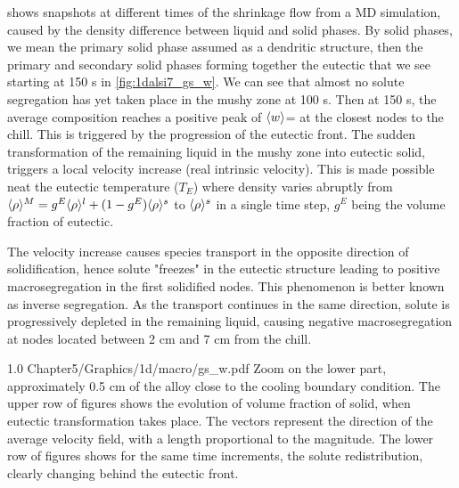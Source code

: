  shows snapshots at different times of the shrinkage flow from a MD simulation, caused by the density difference between liquid and solid phases.
By solid phases, we mean the primary solid phase assumed as a dendritic structure, then the primary and secondary solid phases forming together the eutectic
that we see starting at 150 s in \cref{fig:1dalsi7_gs_w}. 
We can see that almost no solute segregation has yet taken place in the mushy zone at 100 s.
Then at 150 s, the average composition reaches a positive peak of $\langle w \rangle$= at the closest nodes to the chill. 
This is triggered by the progression of the eutectic front.
The sudden transformation of the remaining liquid in the mushy zone into eutectic solid, triggers a local velocity increase (real intrinsic velocity).
This is made possible neat the eutectic temperature ($T_E$) where density varies abruptly from $\langle \rho \rangle^M=g^E \langle \rho \rangle^l + (1-g^E) \langle \rho \rangle^s$ to $\langle \rho \rangle^s$ 
in a single time step, $g^E$ being the volume fraction of eutectic. 

The velocity increase causes species transport in the opposite direction of solidification,
hence solute "freezes" in the eutectic structure leading to positive macrosegregation
in the first solidified nodes. This phenomenon is better known as inverse segregation. 
As the transport continues in the same direction, 
solute is progressively depleted in the remaining liquid, causing negative macrosegregation at nodes located between 2 cm and 7 cm from the chill.

\begin{figureth}
{1.0}
{Chapter5/Graphics/1d/macro/gs_w.pdf}
{Zoom on the lower part, approximately 0.5 cm of the alloy close to the cooling boundary condition. 
The upper row of figures shows the evolution of volume fraction of solid, when eutectic transformation takes place. 
The vectors represent the direction of the average velocity field, with a length proportional
to the magnitude. The lower row of figures shows for the same time increments, the solute redistribution, 
clearly changing behind the eutectic front.}
\label{fig:1dalsi7_gs_w}
\end{figureth}

